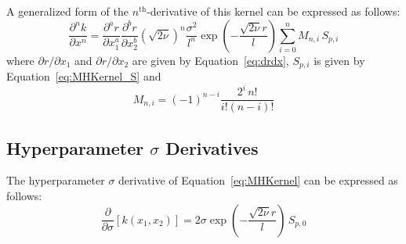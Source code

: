 \documentclass{article}
\begin{document}
\begin{comment}
\begin{equation}
\label{eq:MHKernel_d1x}
	\begin{gathered}
	\frac{\partial k\!\left(x_1,x_2\right)}{\partial x_1} = - \frac{\partial r}{\partial x_1} \frac{\sqrt{2 \nu}}{l} \, \sigma^2 \exp{\left(-\frac{\sqrt{2 \nu} r}{l}\right)} \left(S_0 - 2 S_1\right) \\
	\frac{\partial k\!\left(x_1,x_2\right)}{\partial x_2} = - \frac{\partial r}{\partial x_2} \frac{\sqrt{2 \nu}}{l} \, \sigma^2 \exp{\left(-\frac{\sqrt{2 \nu} r}{l}\right)} \left(S_0 - 2 S_1\right)
	\end{gathered}
\end{equation}

\begin{equation}
\label{eq:MHKernel_d2x}
	\frac{\partial^2 k\!\left(x_1,x_2\right)}{\partial x_1 \partial x_2} = \frac{\partial r}{\partial x_1} \frac{\partial r}{\partial x_2} \frac{2 \nu}{l^2} \, \sigma^2 \exp{\left(-\frac{\sqrt{2 \nu} r}{l}\right)} \left(S_0 - 4 S_1 + 4 S_2\right)
\end{equation}
\end{comment}

A generalized form of the $n^{\text{th}}$-derivative of this kernel can be expressed as follows:
\begin{equation}
\label{eq:MHKernel_dnx}
	\frac{\partial^n k}{\partial x^n} = \frac{\partial^a r}{\partial x_1^a} \frac{\partial^b r}{\partial x_2^b} \left(\sqrt{2 \nu}\right)^n \frac{\sigma^2}{l^n} \exp{\left(-\frac{\sqrt{2 \nu} r}{l}\right)} \sum_{i=0}^{n} M_{n,i} \, S_{p,i}
\end{equation}
where $\partial r/\partial x_1$ and $\partial r/\partial x_2$ are given by Equation~\eqref{eq:drdx}, $S_{p,i}$ is given by Equation~\eqref{eq:MHKernel_S} and
\begin{equation}
\label{eq:MHKernel_M}
	M_{n,i} = \left(-1\right)^{n-i} \frac{2^i \, n!}{i! \left(n - i\right)!}
\end{equation}

\subsection{Hyperparameter $\sigma$ Derivatives}
\label{subsec:MHHypDer_s}

The hyperparameter $\sigma$ derivative of Equation~\eqref{eq:MHKernel} can be expressed as follows:
\begin{equation}
\label{eq:MHKernel_ds}
	\frac{\partial}{\partial \sigma} \left[k\!\left(x_1,x_2\right)\right] = 2 \sigma \exp{\left(-\frac{\sqrt{2 \nu} r}{l}\right)} \, S_{p,0}
\end{equation}
\end{document}
